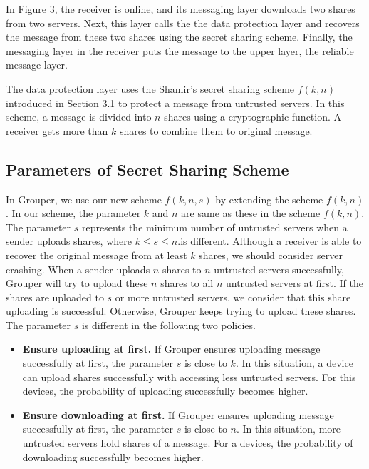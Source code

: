 \documentclass[twocolumn,10pt]{article}
\begin{document}
In Figure 3, the receiver is online, and its messaging layer downloads two shares from two servers.
Next, this layer calls the the data protection layer and recovers the message from these two shares using the secret sharing scheme.
Finally, the messaging layer in the receiver puts the message to the upper layer, the reliable message layer.

The data protection layer uses the Shamir's secret sharing scheme $f(k, n)$ introduced in Section 3.1 to protect a message from untrusted servers.
In this scheme, a message is divided into $n$ shares using a cryptographic function.
A receiver gets more than $k$ shares to combine them to original message.

\subsection{Parameters of Secret Sharing Scheme}

In Grouper, we use our new scheme $ f(k, n, s)$ by extending the scheme $f(k, n)$.
In our scheme, the parameter $k$ and $n$ are same as these in the scheme $f(k, n)$. 
The  parameter $s$ represents the minimum number of untrusted servers when a sender uploads shares, where $k \leq s \leq n$.is different.
Although a receiver is able to recover the original message from at least $k$ shares, we should consider server crashing. 
When a sender uploads $n$ shares to $n$ untrusted servers successfully, Grouper will try to upload these $n$ shares to all $n$ untrusted servers at first. 
If the shares are uploaded to $s$ or more untrusted servers, we consider that this share uploading is successful.
Otherwise, Grouper keeps trying to upload these shares.
The parameter $s$ is different in the following two policies.

\begin{itemize}
	\setlength{\itemsep}{1pt}
	\setlength{\parskip}{0pt}
	\setlength{\parsep}{0pt}
	\item \textbf{Ensure uploading at first.} 
	If Grouper ensures uploading message successfully at first, the parameter $s$ is close to $k$.
	In this situation, a device can upload shares successfully with accessing less untrusted servers.
	For this devices, the probability of uploading successfully becomes higher.
	\item \textbf{Ensure downloading at first.}
	If Grouper ensures uploading message successfully at first, the parameter $s$ is close to $n$.
	In this situation, more untrusted servers hold shares of a message.
	For a devices, the probability of downloading successfully becomes higher.
\end{itemize}
\end{document}
